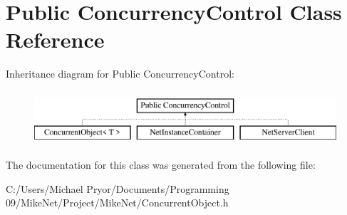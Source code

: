 \hypertarget{class_public_01_concurrency_control}{
\section{Public ConcurrencyControl Class Reference}
\label{class_public_01_concurrency_control}
}
Inheritance diagram for Public ConcurrencyControl:\begin{figure}[H]
\begin{center}
\leavevmode
\includegraphics[height=2.000000cm]{class_public_01_concurrency_control}
\end{center}
\end{figure}


The documentation for this class was generated from the following file:\begin{DoxyCompactItemize}
\item 
C:/Users/Michael Pryor/Documents/Programming 09/MikeNet/Project/MikeNet/ConcurrentObject.h\end{DoxyCompactItemize}
